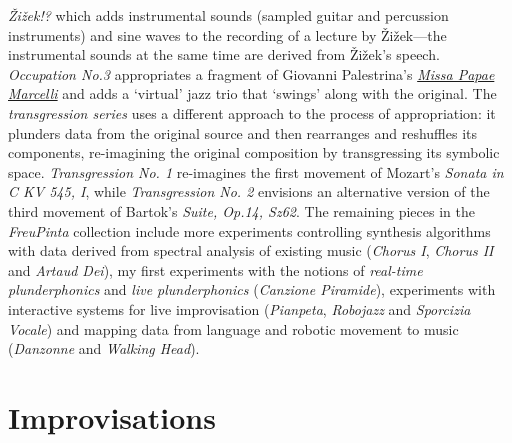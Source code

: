\emph{\v{Z}i\v{z}ek!?} which adds instrumental sounds (sampled guitar and percussion instruments) and sine waves to the recording of a lecture by \v{Z}i\v{z}ek---the instrumental sounds at the same time are derived from \v{Z}i\v{z}ek's speech. \emph{Occupation No.3} appropriates a fragment of Giovanni Palestrina's \href{http://en.wikipedia.org/wiki/Missa_Papae_Marcelli}{\emph{Missa Papae Marcelli}} and adds a `virtual' jazz trio that `swings' along with the original. The \emph{transgression series} uses a different approach to the process of appropriation: it plunders data from the original source and then rearranges and reshuffles its components, re-imagining the original composition by transgressing its symbolic space. \emph{Transgression No. 1} re-imagines the first movement of Mozart's \emph{Sonata in C KV 545, I}, while \emph{Transgression No. 2} envisions an alternative version of the third movement of Bartok's \emph{Suite, Op.14, Sz62}. The remaining pieces in the \emph{FreuPinta} collection include more experiments controlling synthesis algorithms with data derived from spectral analysis of existing music (\emph{Chorus I}, \emph{Chorus II} and \emph{Artaud Dei}), my first experiments with the notions of \emph{real-time plunderphonics} and \emph{live plunderphonics} (\emph{Canzione Piramide}), experiments with interactive systems for live improvisation (\emph{Pianpeta}, \emph{Robojazz} and \emph{Sporcizia Vocale}) and mapping data from language and robotic movement to music (\emph{Danzonne} and \emph{Walking Head}).

\section{Improvisations}

